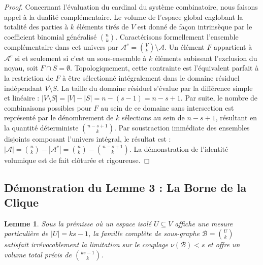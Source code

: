 \documentclass[12pt]{article}
\newtheorem{lemma}{Lemme}
\begin{document}
\begin{proof}
Concernant l'\'evaluation du cardinal du syst\`eme combinatoire, nous faisons appel \`a la dualit\'e compl\'ementaire.
Le volume de l'espace global englobant la totalit\'e des parties \`a $k$ \'el\'ements tir\'es de $V$ est donn\'e de fa\c{c}on intrins\`eque par le coefficient binomial g\'en\'eralis\'e $\binom{n}{k}$.
Caract\'erisons formellement l'ensemble compl\'ementaire dans cet univers par $\mathcal{A}^c = \binom{V}{k} \setminus \mathcal{A}$.
Un \'el\'ement $F$ appartient \`a $\mathcal{A}^c$ si et seulement si c'est un sous-ensemble \`a $k$ \'el\'ements subissant l'exclusion du noyau, soit $F \cap S = \emptyset$.
Topologiquement, cette contrainte est l'\'equivalent parfait \`a la restriction de $F$ \`a \^etre s\'electionn\'e int\'egralement dans le domaine r\'esiduel ind\'ependant $V \setminus S$.
La taille du domaine r\'esiduel s'\'evalue par la diff\'erence simple et lin\'eaire : $|V \setminus S| = |V| - |S| = n - (s - 1) = n - s + 1$.
Par suite, le nombre de combinaisons possibles pour $F$ au sein de ce domaine sans intersection est repr\'esent\'e par le d\'enombrement de $k$ s\'elections au sein de $n - s + 1$, r\'esultant en la quantit\'e d\'eterministe $\binom{n - s + 1}{k}$.
Par soustraction imm\'ediate des ensembles disjoints composant l'univers int\'egral, le r\'esultat est :
$|\mathcal{A}| = \binom{n}{k} - |\mathcal{A}^c| = \binom{n}{k} - \binom{n - s + 1}{k}$.
La d\'emonstration de l'identit\'e volumique est de fait cl\^otur\'ee et rigoureuse.
\end{proof}

\newpage
\subsection{D\'emonstration du Lemme 3 : La Borne de la Clique}

\begin{lemma}
Sous la pr\'emisse o\`u un espace isol\'e $U \subseteq V$ affiche une mesure particuli\`ere de $|U| = ks - 1$, la famille compl\`ete de sous-graphe $\mathcal{B} = \binom{U}{k}$ satisfait irr\'evocablement la limitation sur le couplage $\nu(\mathcal{B}) < s$ et offre un volume total pr\'ecis de $\binom{ks - 1}{k}$.
\end{lemma}
\end{document}
